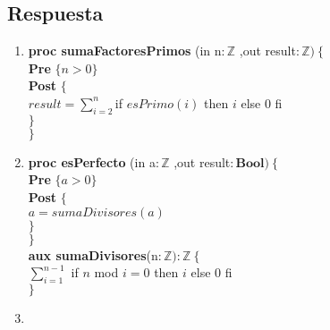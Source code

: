 \documentclass[a4paper]{article}
\begin{document}
\subsection*{Respuesta}
	\begin{enumerate}[label=\alph*)]
		\item
			
			\textbf{proc sumaFactoresPrimos }(in n$:\mathbb{Z}$
				,out result$: \mathbb{Z} )\ \{$\smallskip \\
			\hspace*{6mm} \textbf{Pre }$\{n>0 \}$\smallskip \\
			\hspace*{6mm} \textbf{Post }$\{$\\
			\hspace*{6mm} $result=\sum_{i=2}^{n}$if $esPrimo(i)$ then $i$ else 0 fi\\
			\hspace*{6mm} $\}$\\
			$\}$\smallskip \\		
			
		\item
			
			\textbf{proc esPerfecto }(in a$:\mathbb{Z}$
				,out result$:\textbf{Bool} )\ \{$\smallskip \\
			\hspace*{6mm} \textbf{Pre }$\{a>0 \}$\smallskip \\
			\hspace*{6mm} \textbf{Post }$\{$\\
			\hspace*{6mm} $a=sumaDivisores(a)$\\
			\hspace*{6mm} $\}$\\
			$\}$\smallskip \\
			
			\textbf{aux sumaDivisores}(n$: \mathbb{Z}):\mathbb{Z}\ \{$\smallskip \\
			\hspace*{6mm}$\sum_{i=1}^{n-1}$ if $n$ mod $i=0$ then $i$ else 0 fi \\
			$\}$	
			
		\item
		

\end{enumerate}
\end{document}
